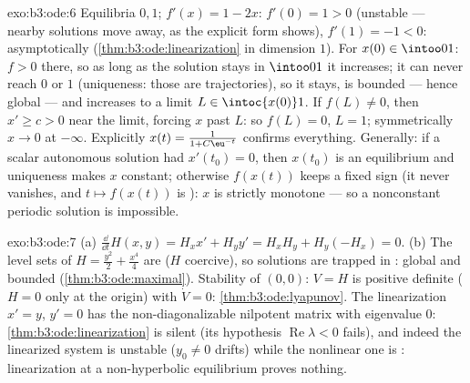 \begin{solution}{exo:b3:ode:6}
Equilibria $0, 1$; $f'(x) = 1 - 2x$: $f'(0) = 1 > 0$
(unstable --- nearby solutions move away, as the explicit
form shows), $f'(1) = -1 < 0$: asymptotically 
(\cref{thm:b3:ode:linearization} in dimension $1$). For
$x(0) \in \intoo01$: $f > 0$ there, so as long as the
solution stays in $\intoo01$ it increases; it can never reach
$0$ or $1$ (uniqueness: those are trajectories), so it stays,
is bounded --- hence global --- and increases to a limit $L
\in \intoc{x(0)}1$. If $f(L) \neq 0$, then $x' \geq c > 0$
near the limit, forcing $x$ past $L$: so $f(L) = 0$, $L = 1$;
symmetrically $x \to 0$ at $-\infty$. Explicitly $x(t) =
\frac1{1 + C\eu^{-t}}$ confirms everything. Generally: if a
scalar autonomous solution had $x'(t_0) = 0$, then $x(t_0)$
is an equilibrium and uniqueness makes $x$ constant;
otherwise $f(x(t))$ keeps a fixed sign (it never vanishes,
and $t \mapsto f(x(t))$ is ): $x$ is strictly
monotone --- so a nonconstant periodic solution is
impossible.
\end{solution}

\begin{solution}{exo:b3:ode:7}
(a) $\frac{\dd}{\dd t}H(x,y) = H_xx' + H_yy' = H_xH_y +
H_y(-H_x) = 0$.
(b) The level sets of $H = \frac{y^2}2 + \frac{x^4}4$ are
 ($H$ coercive), so solutions are trapped in :
global and bounded (\cref{thm:b3:ode:maximal}). Stability of
$(0,0)$: $V = H$ is positive definite ($H = 0$ only at the
origin) with $\dot V = 0$: \cref{thm:b3:ode:lyapunov}. The
linearization $x' = y$, $y' = 0$ has the non-diagonalizable
nilpotent matrix with eigenvalue $0$:
\cref{thm:b3:ode:linearization} is silent (its hypothesis
$\operatorname{Re}\lambda < 0$ fails), and indeed the
linearized system is unstable ($y_0 \ne 0$ drifts) while the
nonlinear one is : linearization at a non-hyperbolic
equilibrium proves nothing.
\end{solution}

